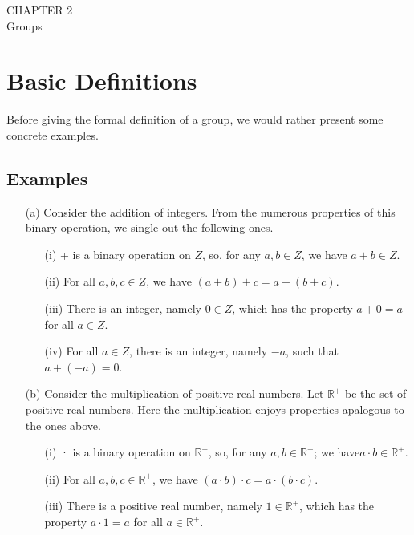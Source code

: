 \documentclass[11pt]{amsbook}
\begin{document}
	
	\bigskip
	{\centering
	\Huge{CHAPTER 2}\\
	\huge{Groups}\bigskip\bigskip\bigskip
	\Large{\section{Basic Definitions}}\par}
	\bigskip\noindent
	Before giving the formal definition of a group, we would rather present
	some concrete examples.\\\noindent
	\subsection{Examples}
	\begin{enumerate}
		\item[(a)] Consider the addition of integers. From the numerous
		properties of this binary operation, we single out the following ones.
		\begin{enumerate} 
			\item[(i)] + is a binary operation on $Z$, so, for any $a,b \in Z$, we have $a + b \in Z$.	
			\item[(ii)] For all $a, b, c \in Z$, we have $(a + b) + c = a + (b + c)$.	
			\item[(iii)] There is an integer, namely $0 \in Z$, which has the property $a + 0 = a$ for all $a \in Z$. 
			\item[(iv)] For all $a \in Z$, there is an integer, namely $-a$, such that\qquad\quad $a + (-a) = 0$. 
		\end{enumerate}
		\item[(b)] Consider the multiplication of positive real numbers. Let $\mathbb{R}^{+}$ be the set of positive real numbers. Here the multiplication enjoys properties apalogous to the ones above.
		\begin{enumerate} 
			\item[(i)]  · is a binary operation on $\mathbb{R}^{+}$, so, for any $a, b \in \mathbb{R}^{+}$; we have\quad $a \cdot b \in \mathbb{R}^{+}$. 
			\item[(ii)] For all $a, b, c \in \mathbb{R}^{+}$, we have $(a \cdot b) \cdot c  = a \cdot (b \cdot c)$. 
			\item[(iii)] There is a positive real number, namely $1 \in \mathbb{R}^{+}$, which has	the property $a \cdot 1 = a$ for all $a \in \mathbb{R}^{+}$.
		\end{enumerate}
	\end{enumerate}	
\end{document}
